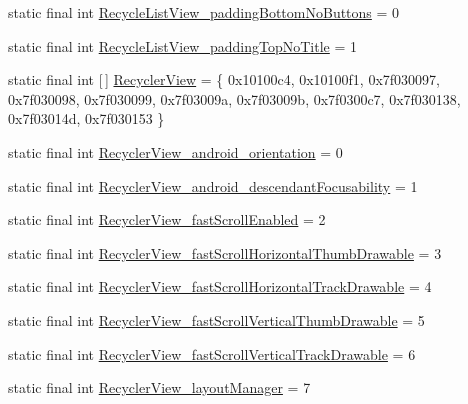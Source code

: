 \begin{DoxyCompactItemize}
\item 
static final int \mbox{\hyperlink{classcom_1_1synnapps_1_1carouselview_1_1_r_1_1styleable_a4f4b8d5c6939e8aedd0c1cd3edad88a1}{Recycle\+List\+View\+\_\+padding\+Bottom\+No\+Buttons}} = 0
\item 
static final int \mbox{\hyperlink{classcom_1_1synnapps_1_1carouselview_1_1_r_1_1styleable_a0d2dd7e8cff427d6c6ab39728b2ee561}{Recycle\+List\+View\+\_\+padding\+Top\+No\+Title}} = 1
\item 
static final int \mbox{[}$\,$\mbox{]} \mbox{\hyperlink{classcom_1_1synnapps_1_1carouselview_1_1_r_1_1styleable_ab8fb9e7187e376d53ba8268118a6be42}{Recycler\+View}} = \{ 0x10100c4, 0x10100f1, 0x7f030097, 0x7f030098, 0x7f030099, 0x7f03009a, 0x7f03009b, 0x7f0300c7, 0x7f030138, 0x7f03014d, 0x7f030153 \}
\item 
static final int \mbox{\hyperlink{classcom_1_1synnapps_1_1carouselview_1_1_r_1_1styleable_a8b1908be5e3b6ae26a46be4732288e5b}{Recycler\+View\+\_\+android\+\_\+orientation}} = 0
\item 
static final int \mbox{\hyperlink{classcom_1_1synnapps_1_1carouselview_1_1_r_1_1styleable_a833a64bdc0fcba2a0599a5661a7610ba}{Recycler\+View\+\_\+android\+\_\+descendant\+Focusability}} = 1
\item 
static final int \mbox{\hyperlink{classcom_1_1synnapps_1_1carouselview_1_1_r_1_1styleable_a551a752f811496d33f26ba512315c6bb}{Recycler\+View\+\_\+fast\+Scroll\+Enabled}} = 2
\item 
static final int \mbox{\hyperlink{classcom_1_1synnapps_1_1carouselview_1_1_r_1_1styleable_a56a98f88dacd9570f86ccadef1735629}{Recycler\+View\+\_\+fast\+Scroll\+Horizontal\+Thumb\+Drawable}} = 3
\item 
static final int \mbox{\hyperlink{classcom_1_1synnapps_1_1carouselview_1_1_r_1_1styleable_a119656845d6a99f11c586a6b5e507a6e}{Recycler\+View\+\_\+fast\+Scroll\+Horizontal\+Track\+Drawable}} = 4
\item 
static final int \mbox{\hyperlink{classcom_1_1synnapps_1_1carouselview_1_1_r_1_1styleable_a7b66c59e44c0c137f1f64b5b36514584}{Recycler\+View\+\_\+fast\+Scroll\+Vertical\+Thumb\+Drawable}} = 5
\item 
static final int \mbox{\hyperlink{classcom_1_1synnapps_1_1carouselview_1_1_r_1_1styleable_a3da1aa064e80cdca757420643af82cbf}{Recycler\+View\+\_\+fast\+Scroll\+Vertical\+Track\+Drawable}} = 6
\item 
static final int \mbox{\hyperlink{classcom_1_1synnapps_1_1carouselview_1_1_r_1_1styleable_adee76e0f4211f35e11a8376030e2c6eb}{Recycler\+View\+\_\+layout\+Manager}} = 7

\end{DoxyCompactItemize}
